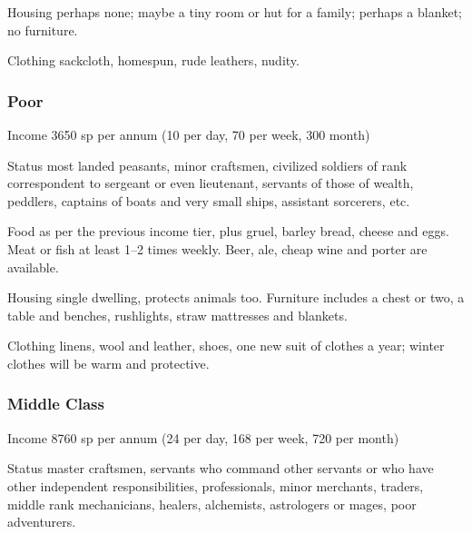 \documentclass[twoside,a4paper]{article}
\begin{document}
\begin{multicols}{2}
\begin{idesc}
\item[Housing] perhaps none; maybe a tiny room or hut for a family;
perhaps a blanket; no furniture.

\item[Clothing] sackcloth, homespun, rude leathers, nudity.

\end{idesc}

\subsubsection{Poor}

\begin{idesc}

\item[Income] 3650 sp per annum (10 per day, 70 per week, 300 month)

\item[Status] most landed peasants, minor craftsmen, civilized
soldiers of rank correspondent to sergeant or even lieutenant,
servants of those of wealth, peddlers, captains of boats and very
small ships, assistant sorcerers, etc.

\item[Food] as per the previous income tier, plus gruel, barley bread,
cheese and eggs. Meat or fish at least 1--2 times weekly.  Beer, ale,
cheap wine and porter are available.

\item[Housing] single dwelling, protects animals too.  Furniture
includes a chest or two, a table and benches, rushlights, straw
mattresses and blankets.

\item[Clothing] linens, wool and leather, shoes, one new suit of
clothes a year; winter clothes will be warm and protective.

\end{idesc}


\subsubsection{Middle Class}

\begin{idesc}

\item[Income] 8760 sp per annum (24 per day, 168 per week, 720 per month)

\item[Status] master craftsmen, servants who command other servants or
who have other independent responsibilities, professionals, minor
merchants, traders, middle rank mechanicians, healers, alchemists,
astrologers or mages, poor adventurers.


\end{idesc}
\end{multicols}
\end{document}
